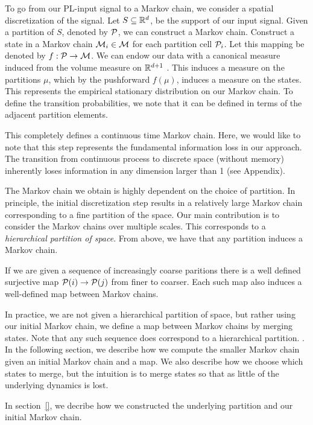 To go from our PL-input signal to a Markov chain, we consider a spatial discretization of the signal.
Let $S\subseteq \mathbb{R}^d$, be the support of our input signal. Given a partition of $S$, denoted by  $\mathcal{P}$, 
we can construct a Markov chain. Construct a  state in a Markov chain $\mathcal{M}_i \in \mathcal{M}$ for each  partition cell $\mathcal{P}_i$. Let this mapping be denoted by $f:\mathcal{P} \rightarrow \mathcal{M}$. We can endow our data with a canonical measure induced from the volume measure on $\mathbb{R}^{d+1}$ . This induces a measure on the partitions $\mu$, which by the  pushforward $f(\mu)$, induces a measure on the states. This represents the empirical stationary distribution on our Markov chain. To define the transition probabilities, we note that it can be defined in terms of the adjacent partition elements.  

This completely defines a continuous time Markov chain. Here, we would like to note that this step represents the fundamental information loss in our approach. The transition from continuous process to discrete space (without memory) inherently loses information in any dimension larger than 1 (see Appendix).  

The Markov chain we obtain is highly dependent on the choice of partition. In principle, the initial discretization step  results in a relatively large Markov chain corresponding to a fine partition of the space. Our main contribution is to consider the Markov chains over multiple scales. This corresponds to a \emph{hierarchical partition of space}. From above, we have that any partition induces a Markov chain. 

If we are given a sequence of increasingly coarse paritions there is a well defined surjective map 
$\mathcal{P}(i)\rightarrow\mathcal{P}(j)$ from finer to coarser. Each such map also induces a well-defined map between Markov chains. 

In practice, we are not given a hierarchical partition of space, but rather using our initial Markov chain, we define a map between Markov chains by merging states. Note that any such sequence does correspond to a hierarchical partition. .  In the following section, we describe how we compute the smaller Markov chain given an initial Markov chain and a map. We also describe how we choose which states to merge, but the intuition is to merge states so that as little of the underlying dynamics is lost. 

In section~\ref{}, we decribe how we constructed the underlying partition and our initial Markov chain.  




